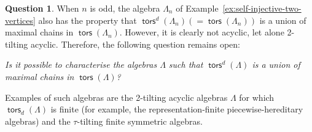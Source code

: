 \documentclass[a4paper,11pt]{amsart}
\theoremstyle{plain}
\theoremstyle{definition}
\newtheorem{question}[thm]{Question}
\DeclareMathOperator{\tors}{\mathsf{tors}}
\begin{document}
\begin{question}
	When $n$ is odd, the algebra $\Lambda_n$ of
	Example~\ref{ex:self-injective-two-vertices} also has the property that
	$\tors^d(\Lambda_n)(=\tors(\Lambda_n))$ is a union of maximal chains in
	$\tors(\Lambda_n)$. However, it is clearly not acyclic, let alone 2-tilting
	acyclic. Therefore, the following question remains open:

	\textit{Is it possible to characterise the algebras $\Lambda$ such that
	$\tors^d(\Lambda)$ is a union of maximal chains in $\tors(\Lambda)$?}

	Examples of such algebras are the 2-tilting acyclic algebras $\Lambda$ for which
	$\tors_d(\Lambda)$ is finite (for example, the representation-finite
	piecewise-hereditary algebras) and the $\tau$-tilting finite symmetric
	algebras.
\end{question}



\end{document}
